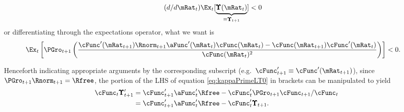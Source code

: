 \documentclass[./BufferStockTheory.tex]{subfiles}
\begin{document}
\begin{equation}\begin{gathered}\begin{aligned}
  (d/d\mRat_{t})\Ex_{t}[\underbrace{\pmb{\Upsilon}(\mRat_{t})}_{\equiv \pmb{\Upsilon}_{t+1}}]  & < 0  \nonumber
\end{aligned}\end{gathered}\end{equation}
or differentiating through the expectations operator, what we want is
\begin{equation}\begin{gathered}\begin{aligned}
\Ex_{t}\left[\PGro_{t+1} \left(\frac{\cFunc^{\prime}(\mRat_{t+1})\Rnorm_{t+1}\aFunc^{\prime}(\mRat_{t})\cFunc(\mRat_{t})-\cFunc(\mRat_{t+1})\cFunc^{\prime}(\mRat_{t})}{\cFunc(\mRat_{t})^{2}}\right)\right]  & < 0 \label{eq:kappaPrimeLT0}.
\end{aligned}\end{gathered}\end{equation}

Henceforth indicating appropriate arguments by the corresponding
subscript (e.g.\ $\cFunc_{t+1}^{\prime} \equiv \cFunc^{\prime}(\mRat_{t+1})$), since
$\PGro_{t+1}\Rnorm_{t+1}=\Rfree$, the portion of the LHS of equation \eqref{eq:kappaPrimeLT0} in brackets can be manipulated to yield
\begin{equation}\begin{gathered}\begin{aligned}
 \cFunc_{t} \pmb{\Upsilon}^{\prime}_{t+1}  & = \cFunc^{\prime}_{t+1}\aFunc^{\prime}_{t}\Rfree-\cFunc^{\prime}_{t} \PGro_{t+1} \cFunc_{t+1}/\cFunc_{t} \nonumber
\\  & = \cFunc^{\prime}_{t+1}\aFunc^{\prime}_{t}\Rfree-\cFunc^{\prime}_{t} \pmb{\Upsilon}_{t+1} \label{eq:cPrimek}
.
\end{aligned}\end{gathered}\end{equation}
\end{document}
